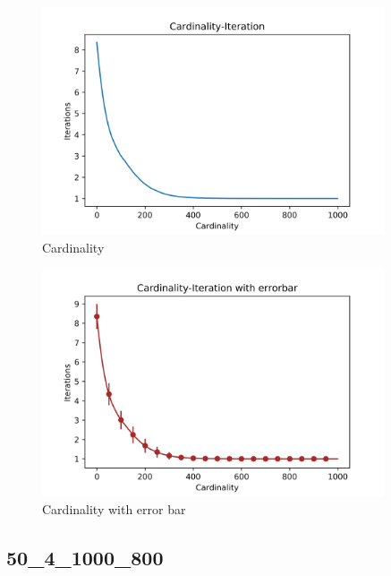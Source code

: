 \documentclass[a4paper,12pt]{article}
\begin{document}
    \begin{figure}[H]
    	\centering
    	\includegraphics[width=0.9\textwidth]{Card50_4_1000_800}
    	\caption{Cardinality}\label{Card50_4_1000_800}
    \end{figure}
    \begin{figure}[H]
    	\centering
    	\includegraphics[width=0.9\textwidth]{CardErr50_4_1000_800}
    	\caption{Cardinality with error bar}\label{CardErr50_4_1000_800}
    \end{figure}
    \subsection{50\_4\_1000\_800}
\end{document}
